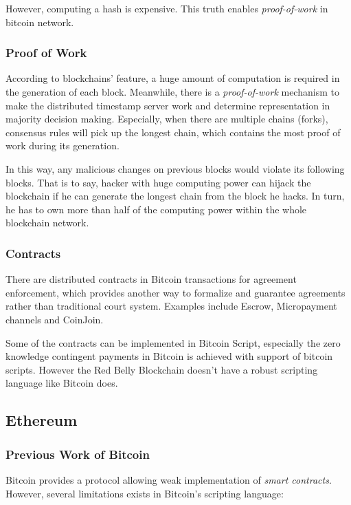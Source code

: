 \documentclass[12pt]{article}
\begin{document}
However, computing a hash is expensive. This truth enables \textit{proof-of-work} in bitcoin network. 

\subsubsection{Proof of Work}

According to blockchains' feature, a huge amount of computation is required in the generation of each block. Meanwhile, there is a \textit{proof-of-work} mechanism to make the distributed timestamp server work and determine representation in majority decision making. Especially, when there are multiple chains (forks), consensus rules will pick up the longest chain, which contains the most proof of work during its generation\cite{nakamoto2008bitcoin}.

In this way, any malicious changes on previous blocks would violate its following blocks. That is to say, hacker with huge computing power can hijack the blockchain if he can generate the longest chain from the block he hacks. In turn, he has to own more than half of the computing power within the whole blockchain network\cite{NG17}.

\subsubsection{Contracts}

There are distributed contracts in Bitcoin transactions for agreement enforcement, which provides another way to formalize and guarantee agreements rather than traditional court system. Examples include Escrow, Micropayment channels and CoinJoin.

Some of the contracts can be implemented in Bitcoin Script, especially the zero knowledge contingent payments in Bitcoin is achieved with support of bitcoin scripts. However the Red Belly Blockchain doesn't have a robust scripting language like Bitcoin does.

\subsection{Ethereum}

\subsubsection{Previous Work of Bitcoin}

Bitcoin provides a protocol allowing weak implementation of \textit{smart contracts}. However, several limitations exists in Bitcoin's scripting language:
\end{document}

